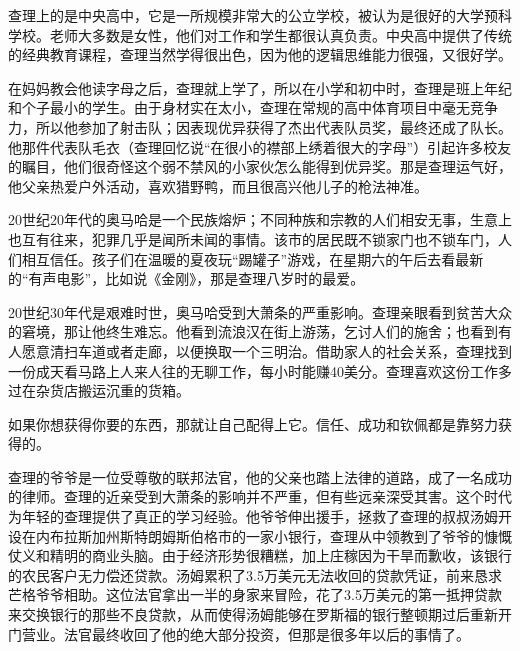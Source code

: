 查理上的是中央高中，它是一所规模非常大的公立学校，被认为是很好的大学预科学校。老师大多数是女性，他们对工作和学生都很认真负责。中央高中提供了传统的经典教育课程，查理当然学得很出色，因为他的逻辑思维能力很强，又很好学。
\par

在妈妈教会他读字母之后，查理就上学了，所以在小学和初中时，查理是班上年纪和个子最小的学生。由于身材实在太小，查理在常规的高中体育项目中毫无竞争力，所以他参加了射击队；因表现优异获得了杰出代表队员奖，最终还成了队长。他那件代表队毛衣（查理回忆说“在很小的襟部上绣着很大的字母”）引起许多校友的瞩目，他们很奇怪这个弱不禁风的小家伙怎么能得到优异奖。那是查理运气好，他父亲热爱户外活动，喜欢猎野鸭，而且很高兴他儿子的枪法神准。
\par

20世纪20年代的奥马哈是一个民族熔炉；不同种族和宗教的人们相安无事，生意上也互有往来，犯罪几乎是闻所未闻的事情。该市的居民既不锁家门也不锁车门，人们相互信任。孩子们在温暖的夏夜玩“踢罐子”游戏，在星期六的午后去看最新的“有声电影”，比如说《金刚》，那是查理八岁时的最爱。
\par

20世纪30年代是艰难时世，奥马哈受到大萧条的严重影响。查理亲眼看到贫苦大众的窘境，那让他终生难忘。他看到流浪汉在街上游荡，乞讨人们的施舍；也看到有人愿意清扫车道或者走廊，以便换取一个三明治。借助家人的社会关系，查理找到一份成天看马路上人来人往的无聊工作，每小时能赚40美分。查理喜欢这份工作多过在杂货店搬运沉重的货箱。
\par

\begin{WisdomBox}
\par

如果你想获得你要的东西，那就让自己配得上它。信任、成功和钦佩都是靠努力获得的。
\par
\end{WisdomBox}

查理的爷爷是一位受尊敬的联邦法官，他的父亲也踏上法律的道路，成了一名成功的律师。查理的近亲受到大萧条的影响并不严重，但有些远亲深受其害。这个时代为年轻的查理提供了真正的学习经验。他爷爷伸出援手，拯救了查理的叔叔汤姆开设在内布拉斯加州斯特朗姆斯伯格市的一家小银行，查理从中领教到了爷爷的慷慨仗义和精明的商业头脑。由于经济形势很糟糕，加上庄稼因为干旱而歉收，该银行的农民客户无力偿还贷款。汤姆累积了3.5万美元无法收回的贷款凭证，前来恳求芒格爷爷相助。这位法官拿出一半的身家来冒险，花了3.5万美元的第一抵押贷款来交换银行的那些不良贷款，从而使得汤姆能够在罗斯福的银行整顿期过后重新开门营业。法官最终收回了他的绝大部分投资，但那是很多年以后的事情了。
\par

